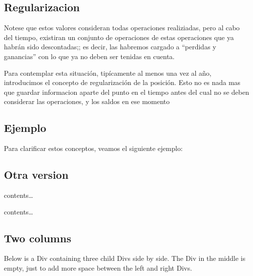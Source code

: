 \documentclass[
  twocolumn]{article}
\begin{document}
\hypertarget{regularizacion}{%
\subsection{Regularizacion}\label{regularizacion}}

Notese que estos valores consideran todas operaciones realiziadas, pero
al cabo del tiempo, existiran un conjunto de operaciones de estas
operaciones que ya habrán sido descontadas;; es decir, las habremos
cargado a ``perdidas y ganancias'' con lo que ya no deben ser tenidas en
cuenta.

Para contemplar esta situación, tipícamente al menos una vez al año,
introducimos el concepto de regularización de la posición. Esto no es
nada mas que guardar informacion aparte del punto en el tiempo antes del
cual no se deben considerar las operaciones, y los saldos en ese momento

\hypertarget{ejemplo}{%
\subsection{Ejemplo}\label{ejemplo}}

Para clarificar estos conceptos, veamos el siguiente ejemplo:

\twocolumn

\hypertarget{otra-version}{%
\subsection{Otra version}\label{otra-version}}

contents\ldots{}

contents\ldots{}

\hypertarget{two-columns}{%
\subsection{Two columns}\label{two-columns}}

Below is a Div containing three child Divs side by side. The Div in the
middle is empty, just to add more space between the left and right Divs.
\end{document}
